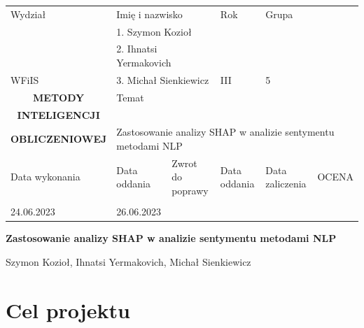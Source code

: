 \documentclass{article}
\begin{document}
\begin{center}
    \begin{adjustwidth}{-0.8cm}{0cm}
    \begin{tabular}{ | p{3cm} | l | l | l | l | l | }
    \hline
    Wydział & \multicolumn{2}{l|}{Imię i nazwisko} & Rok & \multicolumn{2}{l|}{Grupa}  \\ 
    & \multicolumn{2}{l|}{1. Szymon Kozioł} & & \multicolumn{2}{l|}{}  \\ 
    & \multicolumn{2}{l|}{2. Ihnatsi Yermakovich} &  & \multicolumn{2}{l|}{}  \\
    WFiIS & \multicolumn{2}{l|}{3. Michał Sienkiewicz} & III & \multicolumn{2}{l|}{5} \\ \hline
    \multicolumn{1}{|c|}{\textbf{METODY}} & \multicolumn{5}{l|}{Temat}  \\
    \multicolumn{1}{|c|}{\textbf{INTELIGENCJI}} & \multicolumn{5}{l|}{} \\
    \multicolumn{1}{|c|}{\textbf{OBLICZENIOWEJ}}& \multicolumn{5}{l|}{Zastosowanie analizy SHAP w analizie sentymentu metodami NLP} \\ \hline
    Data wykonania & Data oddania & Zwrot do poprawy & Data oddania & Data zaliczenia & OCENA \\
    & & & & & \\
    24.06.2023 & 26.06.2023 &  &  & & \\
    \hline
    \end{tabular}
    \end{adjustwidth}
\end{center}


\vspace{6mm}

\begin{center}
        \fontsize{24}{24} 
        \selectfont  
        \textbf{Zastosowanie analizy SHAP w analizie sentymentu metodami NLP}
\end{center}

 
\vspace{5mm}

\begin{center}
    Szymon Kozioł, Ihnatsi Yermakovich, Michał Sienkiewicz
\end{center}


\def\contentsname{\empty}
\tableofcontents

\newpage

\section{Cel projektu}
\end{document}
